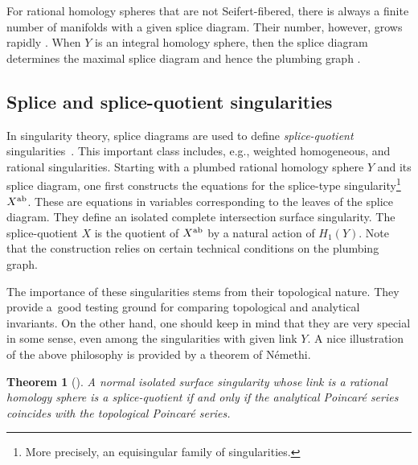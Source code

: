 \documentclass[10pt,a4paper]{amsart}
\newtheorem{Theorem}{Theorem}[section]
\begin{document}
\begin{Remark}
	For rational homology spheres that are not Seifert-fibered, there is always a finite number of manifolds with a given splice diagram. Their number, however, grows rapidly \cite[Proposition~4.3]{Neu07}. When $Y$ is an integral homology sphere, then the splice diagram determines the maximal splice diagram and hence the plumbing graph \cite{EN86}.
\end{Remark}

\subsection{Splice and splice-quotient singularities}\label{ssec:splice_quotient}

In singularity theory, splice diagrams are used to define \emph{splice-quotient} singularities~\cite{NW05a}. This important class includes, e.g., weighted homogeneous, and rational singularities. Starting with a plumbed rational homology sphere $Y$ and its splice diagram, one first constructs the equations for the splice-type singularity\footnote{More precisely, an equisingular family of singularities.} $X^{\rm ab}$. These are equations in variables corresponding to the leaves of the splice diagram. They define an isolated complete intersection surface singularity. The splice-quotient $X$ is the quotient of $X^{\rm ab}$ by a natural action of $H_1(Y)$. Note that the construction relies on certain technical conditions on the plumbing graph.

The importance of these singularities stems from their topological nature. They provide a~good testing ground for comparing topological and analytical invariants. On the other hand, one should keep in mind that they are very special in some sense, even among the singularities with given link $Y$. A nice illustration of the above philosophy is provided by a theorem of N\'emethi.

\begin{Theorem}[{\cite[8.5.19--8.5.26]{Nem22}}]
	 A normal isolated surface singularity whose link is a rational homology sphere is a splice-quotient if and only if the analytical Poincar\'e series coincides with the topological Poincar\'e series.
\end{Theorem}
\end{document}
